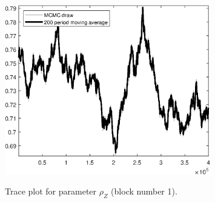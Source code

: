 \begin{figure}[H]
\centering
  \includegraphics[width=0.8\textwidth]{BRS_growth/graphs/TracePlot_rho_Z_blck_1}\\
    \caption{Trace plot for parameter ${\rho_Z}$ (block number 1).}
\end{figure}
